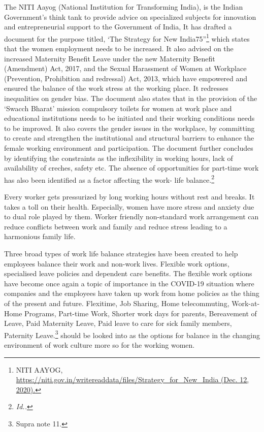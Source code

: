 \begin{multicols}{2}
\noi
The NITI Aayog (National Institution for Transforming India), is the Indian Government’s
think tank to provide advice on specialized subjects for innovation and entrepreneurial
support to the Government of India, It has drafted a document for the purpose titled, ‘The
Strategy for New India\@75”\footnote{NITI AAYOG, \url{https://niti.gov.in/writereaddata/files/Strategy_for_New_India (Dec. 12, 2020).}} which states that the women employment needs to be
increased. It also advised on the increased Maternity Benefit Leave under the new Maternity
Benefit (Amendment) Act, 2017, and the Sexual Harassment of Women at Workplace
(Prevention, Prohibition and redressal) Act, 2013, which have empowered and ensured the
balance of the work stress at the working place. It redresses inequalities on gender bias. The document also states that in the provision of the ‘Swacch Bharat’ mission compulsory toilets
for women at work place and educational institutions needs to be initiated and their working
conditions needs to be improved. It also covers the gender issues in the workplace, by
committing to create and strengthen the institutional and structural barriers to enhance the
female working environment and participation. The document further concludes by
identifying the constraints as the inflexibility in working hours, lack of availability of
creches, safety etc. The absence of opportunities for part-time work has also been identified
as a factor affecting the work- life balance.\footnote{\textit{Id..}}


\noi
Every worker gets pressurized by long working hours without rest and breaks. It takes a toll
on their health. Especially, women have more stress and anxiety due to dual role played by
them. Worker friendly non-standard work arrangement can reduce conflicts between work
and family and reduce stress leading to a harmonious family life.

\noi
Three broad types of work life balance strategies have been created to help employees
balance their work and non-work lives. Flexible work options, specialised leave policies and
dependent care benefits. The flexible work options have become once again a topic of
importance in the COVID-19 situation where companies and the employees have taken up
work from home policies as the thing of the present and future. Flexitime, Job Sharing, Home
telecommuting, Work-at-Home Programs, Part-time Work, Shorter work days for parents,
Bereavement of Leave, Paid Maternity Leave, Paid leave to care for sick family members,
Paternity Leave.\footnote{Supra note 11.} should be looked into as the options for balance in the changing
environment of work culture more so for the working women.


\end{multicols}
